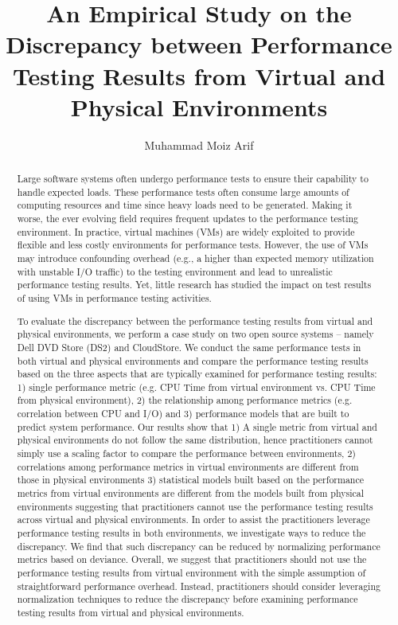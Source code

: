 \documentclass[12pt]{report}
\author{Muhammad Moiz Arif}
\title {An Empirical Study on the Discrepancy between Performance Testing Results from Virtual and Physical Environments}
\begin{document}
\begin{abstract}
Large software systems often undergo performance tests to ensure their capability to handle expected loads. These performance tests often consume large amounts of computing resources and time since heavy loads need to be generated. Making it worse, the ever evolving field requires frequent updates to the performance testing environment. In practice, virtual machines (VMs) are widely exploited to provide flexible and less costly environments for performance tests. However, the use of VMs may introduce confounding overhead (e.g., a higher than expected memory utilization with unstable I/O traffic) to the testing environment and lead to unrealistic performance testing results. Yet, little research has studied the impact on test results of using VMs in performance testing activities. 

To evaluate the discrepancy between the performance testing results from virtual and physical environments, we perform a case study on two open source systems -- namely Dell DVD Store (DS2) and CloudStore. We conduct the same performance tests in both virtual and physical environments and compare the performance testing results based on the three aspects that are typically examined for performance testing results: 1) single performance metric (e.g. CPU Time from virtual environment vs. CPU Time from physical environment), 2) the relationship among performance metrics (e.g. correlation between CPU and I/O) and 3) performance models that are built to predict system performance. Our results show that 1) A single metric from virtual and physical environments do not follow the same distribution, hence practitioners cannot simply use a scaling factor to compare the performance between environments,  2) correlations among performance metrics in virtual environments are different from those in physical environments 3) statistical models built based on the performance metrics from virtual environments are different from the models built from physical environments suggesting that practitioners cannot use the performance testing results across virtual and physical environments. In order to assist the practitioners leverage performance testing results in both environments, we investigate ways to reduce the discrepancy. We find that such discrepancy can be reduced by normalizing performance metrics based on deviance. Overall, we suggest that practitioners should not use the performance testing results from virtual environment with the simple assumption of straightforward performance overhead. Instead, practitioners should consider leveraging normalization techniques to reduce the discrepancy before examining performance testing results from virtual and physical environments.


\end{abstract}
\end{document}
